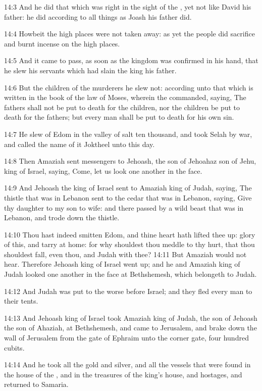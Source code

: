 14:3 And he did that which was right in the sight of the \LORD, yet not
like David his father: he did according to all things as Joash his
father did.

14:4 Howbeit the high places were not taken away: as yet the people
did sacrifice and burnt incense on the high places.

14:5 And it came to pass, as soon as the kingdom was confirmed in his
hand, that he slew his servants which had slain the king his father.

14:6 But the children of the murderers he slew not: according unto
that which is written in the book of the law of Moses, wherein the
\LORD commanded, saying, The fathers shall not be put to death for the
children, nor the children be put to death for the fathers; but every
man shall be put to death for his own sin.

14:7 He slew of Edom in the valley of salt ten thousand, and took
Selah by war, and called the name of it Joktheel unto this day.

14:8 Then Amaziah sent messengers to Jehoash, the son of Jehoahaz son
of Jehu, king of Israel, saying, Come, let us look one another in the
face.

14:9 And Jehoash the king of Israel sent to Amaziah king of Judah,
saying, The thistle that was in Lebanon sent to the cedar that was in
Lebanon, saying, Give thy daughter to my son to wife: and there passed
by a wild beast that was in Lebanon, and trode down the thistle.

14:10 Thou hast indeed smitten Edom, and thine heart hath lifted thee
up: glory of this, and tarry at home: for why shouldest thou meddle to
thy hurt, that thou shouldest fall, even thou, and Judah with thee?
14:11 But Amaziah would not hear. Therefore Jehoash king of Israel
went up; and he and Amaziah king of Judah looked one another in the
face at Bethshemesh, which belongeth to Judah.

14:12 And Judah was put to the worse before Israel; and they fled
every man to their tents.

14:13 And Jehoash king of Israel took Amaziah king of Judah, the son
of Jehoash the son of Ahaziah, at Bethshemesh, and came to Jerusalem,
and brake down the wall of Jerusalem from the gate of Ephraim unto the
corner gate, four hundred cubits.

14:14 And he took all the gold and silver, and all the vessels that
were found in the house of the \LORD, and in the treasures of the
king's house, and hostages, and returned to Samaria.

